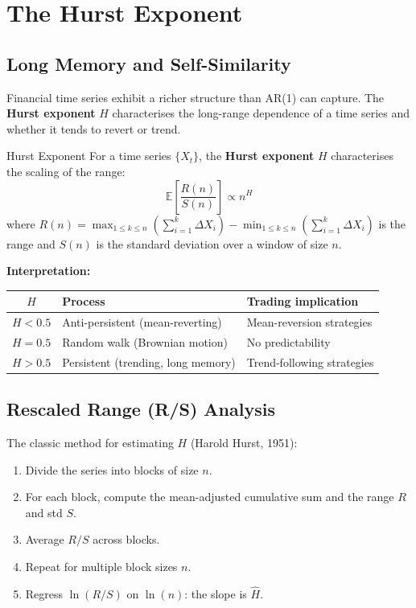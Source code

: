 \documentclass[12pt,a4paper,openany]{report}
\theoremstyle{definition}
\newcommand{\E}{\mathbb{E}}
\begin{document}

\chapter{The Hurst Exponent}

\section{Long Memory and Self-Similarity}

Financial time series exhibit a richer structure than AR(1) can capture. The \textbf{Hurst exponent} $H$ characterises the long-range dependence of a time series and whether it tends to revert or trend.

\begin{definitionbox}{Hurst Exponent}
For a time series $\{X_t\}$, the \textbf{Hurst exponent} $H$ characterises the scaling of the range:
\[
  \E\!\left[\frac{R(n)}{S(n)}\right] \propto n^H
\]
where $R(n) = \max_{1 \leq k \leq n}(\sum_{i=1}^k \Delta X_i) - \min_{1 \leq k \leq n}(\sum_{i=1}^k \Delta X_i)$ is the range and $S(n)$ is the standard deviation over a window of size $n$.
\end{definitionbox}

\textbf{Interpretation:}
\begin{center}
\begin{tabular}{cll}
\toprule
$H$ & \textbf{Process} & \textbf{Trading implication} \\
\midrule
$H < 0.5$ & Anti-persistent (mean-reverting) & Mean-reversion strategies \\
$H = 0.5$ & Random walk (Brownian motion) & No predictability \\
$H > 0.5$ & Persistent (trending, long memory) & Trend-following strategies \\
\bottomrule
\end{tabular}
\end{center}

\section{Rescaled Range (R/S) Analysis}

The classic method for estimating $H$ (Harold Hurst, 1951):

\begin{enumerate}[label=\arabic*.]
  \item Divide the series into blocks of size $n$.
  \item For each block, compute the mean-adjusted cumulative sum and the range $R$ and std $S$.
  \item Average $R/S$ across blocks.
  \item Repeat for multiple block sizes $n$.
  \item Regress $\ln(R/S)$ on $\ln(n)$: the slope is $\hat{H}$.
\end{enumerate}
\end{document}
